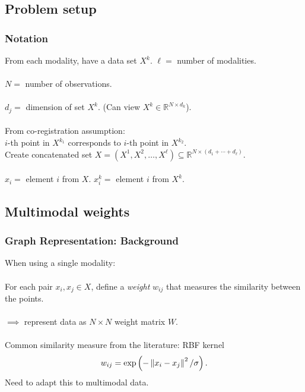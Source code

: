 \documentclass{beamer}
\begin{document}

\subsection{Problem setup}
\begin{frame}
  \frametitle{Notation}
  From each modality, have a data set $X^k$. $\ell = $ number of modalities.\\~\\
  $N = $ number of observations.\\~\\
  $d_j = $ dimension of set $X^k$. (Can view $X^k \in \mathbb{R}^{N\times d_k}$). \\~\\
  From co-registration assumption: \\
  $i$-th point in $X^{k_1}$ corresponds to $i$-th point in $X^{k_2}$. \\
  Create concatenated set $X = (X^1,X^2,\ldots,X^\ell) \subseteq \mathbb{R}^{N\times\left(d_1+\cdots+d_\ell\right)}$. \\~\\
  $x_i = $ element $i$ from $X$. $x_i^k = $ element $i$ from $X^k$.
\end{frame}


\subsection{Multimodal weights}
\begin{frame}
  \frametitle{Graph Representation: Background}
  When using a single modality: \\~\\
  \hspace*{20pt} For each pair $x_i,x_j\in X$, define a \emph{weight} $w_{ij}$ that measures \hspace*{20pt} the similarity between the points. \\~\\
  \hspace*{20pt} $\implies$ represent data as $N \times N$ weight matrix $W$. \\~\\
  \hspace*{20pt} Common similarity measure from the literature: RBF kernel
    \[w_{ij} = \text{exp}\left(-\left\lVert x_i - x_j\right\rVert^2 / \sigma \right).\]
  Need to adapt this to multimodal data.
\end{frame}
\end{document}
